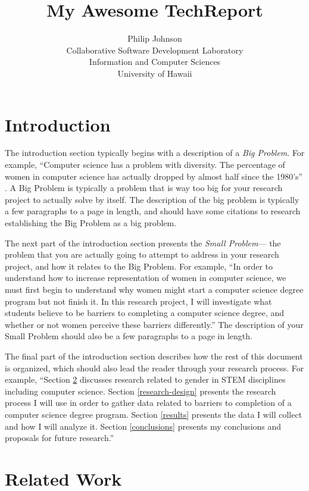 \documentclass[english]{proposalnsf}
\title{My Awesome TechReport}
\author{Philip Johnson \\Collaborative Software Development Laboratory \\ Information and Computer Sciences \\ University of Hawaii}
\begin{document}
\maketitle
\tableofcontents
\newpage

\section{Introduction}
\label{introduction}

The introduction section typically begins with a description of a {\em Big Problem}.  For example, ``Computer science has a problem with diversity.  The percentage of women in computer science has actually dropped by almost half since the 1980's'' \cite{camp_generation_2017}.  A Big Problem is typically a problem that is way too big for your research project to actually solve by itself. The description of the big problem is typically a few paragraphs to a page in length, and should have some citations to research establishing the Big Problem as a big problem.

The next part of the introduction section presents the {\em Small Problem}--- the problem that you are actually going to attempt to address in your research project, and how it relates to the Big Problem.  For example, ``In order to understand how to increase representation of women in computer science, we must first begin to understand why women might start a computer science degree program but not finish it. In this research project, I will investigate what students believe to be barriers to completing a computer science degree, and whether or not women perceive these barriers differently.''  The description of your Small Problem should also be a few paragraphs to a page in length.

The final part of the introduction section describes how the rest of this document is organized, which should also lead the reader through your research process.  For example, ``Section \ref{related-work} discusses research related to gender in STEM disciplines including computer science.  Section \ref{research-design} presents the research process I will use in order to gather data related to barriers to completion of a computer science degree program.  Section \ref{results} presents the data I will collect and how I will analyze it.  Section \ref{conclusions} presents my conclusions and proposals for future research.''

\section{Related Work}
\label{related-work}
\end{document}
